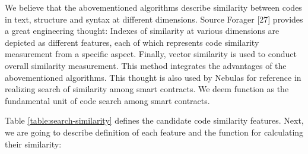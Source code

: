 We believe that the abovementioned algorithms describe similarity between codes in text, structure and syntax at different dimensions. Source Forager [27] provides a great engineering thought: Indexes of similarity at various dimensions are depicted as different features, each of which represents code similarity measurement from a specific aspect. Finally, vector similarity is used to conduct overall similarity measurement. This method integrates the advantages of the abovementioned algorithms. This thought is also used by Nebulas for reference in realizing search of similarity among smart contracts. We deem function as the fundamental unit of code search among smart contracts.


Table \ref{table:search-similarity} defines the candidate code similarity features. Next, we are going to describe definition of each feature and the function for calculating their similarity:



